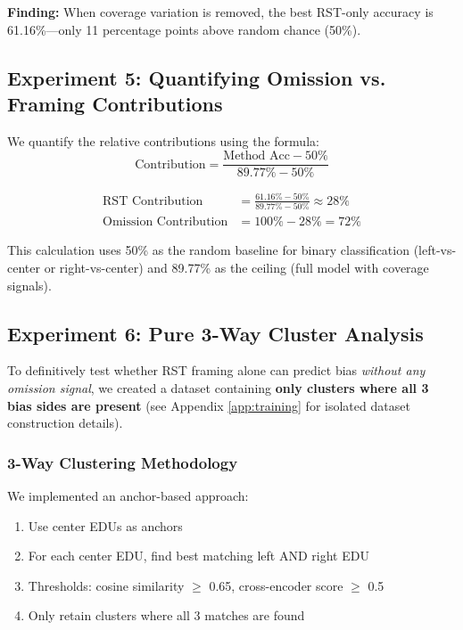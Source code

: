 \documentclass[11pt]{article}
\begin{document}
\textbf{Finding:} When coverage variation is removed, the best RST-only accuracy is 61.16\%---only 11 percentage points above random chance (50\%).

\subsection{Experiment 5: Quantifying Omission vs. Framing Contributions}

We quantify the relative contributions using the formula:
\begin{equation}
\text{Contribution} = \frac{\text{Method Acc} - 50\%}{89.77\% - 50\%}
\end{equation}

\begin{align}
\text{RST Contribution} &= \frac{61.16\% - 50\%}{89.77\% - 50\%} \approx 28\% \\
\text{Omission Contribution} &= 100\% - 28\% = 72\%
\end{align}

This calculation uses 50\% as the random baseline for binary classification (left-vs-center or right-vs-center) and 89.77\% as the ceiling (full model with coverage signals).

\subsection{Experiment 6: Pure 3-Way Cluster Analysis}
\label{sec:3way}

To definitively test whether RST framing alone can predict bias \textit{without any omission signal}, we created a dataset containing \textbf{only clusters where all 3 bias sides are present} (see Appendix \ref{app:training} for isolated dataset construction details).

\subsubsection{3-Way Clustering Methodology}

We implemented an anchor-based approach:
\begin{enumerate}
    \item Use center EDUs as anchors
    \item For each center EDU, find best matching left AND right EDU
    \item Thresholds: cosine similarity $\geq$ 0.65, cross-encoder score $\geq$ 0.5
    \item Only retain clusters where all 3 matches are found
\end{enumerate}
\end{document}
